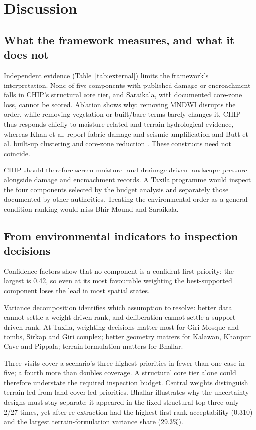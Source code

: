 \section{Discussion}
\subsection{What the framework measures, and what it does not}
Independent evidence (Table~\ref{tab:external}) limits the framework's interpretation. None of five components with published damage or encroachment falls in CHIP's structural core tier, and Saraikala, with documented core-zone loss, cannot be scored. Ablation shows why: removing MNDWI disrupts the order, while removing vegetation or built/bare terms barely changes it. CHIP thus responds chiefly to moisture-related and terrain-hydrological evidence, whereas Khan et al. report fabric damage and seismic amplification \citep{khan2022taxila} and Butt et al. built-up clustering and core-zone reduction \citep{butt2025taxila}. These constructs need not coincide.

CHIP should therefore screen moisture- and drainage-driven landscape pressure alongside damage and encroachment records. A Taxila programme would inspect the four components selected by the budget analysis and separately those documented by other authorities. Treating the environmental order as a general condition ranking would miss Bhir Mound and Saraikala.

\subsection{From environmental indicators to inspection decisions}

Confidence factors show that no component is a confident first priority: the
largest is 0.42, so even at its most favourable weighting the best-supported
component loses the lead in most spatial states.

Variance decomposition identifies which assumption to resolve: better data cannot settle a weight-driven rank, and deliberation cannot settle a support-driven rank. At Taxila, weighting decisions matter most for Giri Mosque and tombs, Sirkap and Giri complex; better geometry matters for Kalawan, Khanpur Cave and Pippala; terrain formulation matters for Bhallar.

Three visits cover a scenario's three highest priorities in fewer than one case in five; a fourth more than doubles coverage. A structural core tier alone could therefore understate the required inspection budget. Central weights distinguish terrain-led from land-cover-led priorities. Bhallar illustrates why the uncertainty designs must stay separate: it appeared in the fixed structural top three only 2/27 times, yet after re-extraction had the highest first-rank acceptability (0.310) and the largest terrain-formulation variance share (29.3\%).

